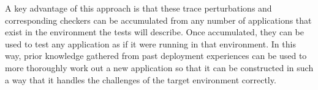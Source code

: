%
%
A key advantage of this approach is that these %
trace perturbations and corresponding checkers can be
accumulated from any number of applications that exist in the environment the tests will describe.  Once accumulated,
they can be used to test any application as if it were running in that environment.  In this way, prior knowledge
gathered from past deployment experiences can be used to more thoroughly work
out a new application so that it can be
constructed in such a way that it handles the challenges of the target environment correctly.

